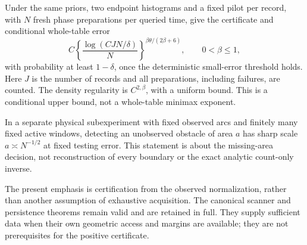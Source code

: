 \begin{theorem}
\label{thm:stat-main}
Under the same priors, two endpoint histograms and a fixed pilot per
record, with $N$ fresh phase preparations per queried time, give the
certificate and conditional whole-table error
\begin{equation}\label{eq:rate-main}
 C\left\{\frac{\log(CJN/\delta)}{N}\right\}^{\beta\theta/(2\beta+6)},
 \qquad 0<\beta\le1,
\end{equation}
with probability at least $1-\delta$, once the deterministic small-error
threshold holds. Here $J$ is the number of records and all preparations,
including failures, are counted. The density regularity is
$C^{2,\beta}$, with a uniform bound. This is a conditional upper bound,
not a whole-table minimax exponent.

In a separate physical subexperiment with fixed observed arcs and finitely
many fixed active windows, detecting an unobserved obstacle of area $a$
has sharp scale $a\asymp N^{-1/2}$ at fixed testing error. This statement
is about the missing-area decision, not reconstruction of every boundary
or the exact analytic count-only inverse.
\end{theorem}

The present emphasis is certification from the observed normalization,
rather than another assumption of exhaustive acquisition. The canonical
scanner and persistence theorems remain valid and are retained in full.
They supply sufficient data when their own geometric access and margins
are available; they are not prerequisites for the positive certificate.
